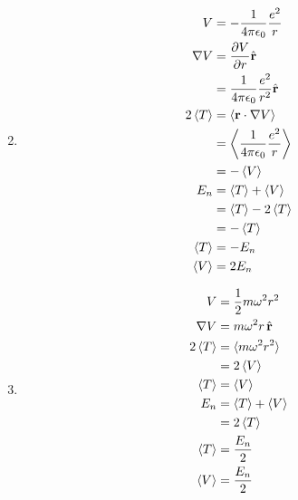 \documentclass{article}
\renewcommand{\vec}[1]{\boldsymbol{\mathbf{#1}}}
\newcommand{\uvec}[1]{\hat{\vec{#1}}}
\begin{document}
\begin{enumerate}
  \setcounter{enumi}{1}
  \item

        \begin{align*}
          V            & = -\frac{1}{4 \pi \epsilon_0} \frac{e^2}{r}           \\
          \nabla V     & = \frac{\partial V}{\partial r} \uvec{r}              \\
                       & = \frac{1}{4 \pi \epsilon_0} \frac{e^2}{r^2} \uvec{r} \\
          2 \braket{T} & = \braket{\vec{r} \cdot \nabla V}                     \\
                       & = \Braket{\frac{1}{4 \pi \epsilon_0} \frac{e^2}{r}}   \\
                       & = -\braket{V}                                         \\
          E_n          & = \braket{T} + \braket{V}                             \\
                       & = \braket{T} - 2 \braket{T}                           \\
                       & = -\braket{T}                                         \\
          \braket{T}   & = -E_n                                                \\
          \braket{V}   & = 2 E_n
        \end{align*}

  \item

        \begin{align*}
          V            & = \frac{1}{2} m \omega^2 r^2 \\
          \nabla V     & = m \omega^2 r \,\uvec{r}    \\
          2 \braket{T} & = \braket{m \omega^2 r^2}    \\
                       & = 2 \braket{V}               \\
          \braket{T}   & = \braket{V}                 \\
          E_n          & = \braket{T} + \braket{V}    \\
                       & = 2 \braket{T}               \\
          \braket{T}   & = \frac{E_n}{2}              \\
          \braket{V}   & = \frac{E_n}{2}
        \end{align*}
\end{enumerate}
\end{document}
